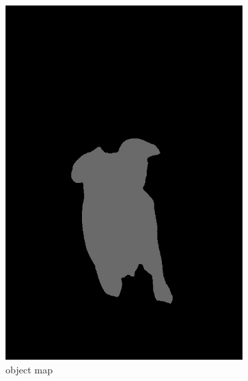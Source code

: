 \documentclass[11pt]{article}
\begin{document}
\begin{figure}[h]
     \centering
     \begin{subfigure}[b]{0.25\textwidth}
         \centering
         \includegraphics[width=\textwidth]{final-2.jpg}
         \caption{object map}
         \label{fig:final}
     \end{subfigure}
     \begin{subfigure}[b]{0.25\textwidth}
         \centering

\end{subfigure}
\end{figure}
\end{document}
